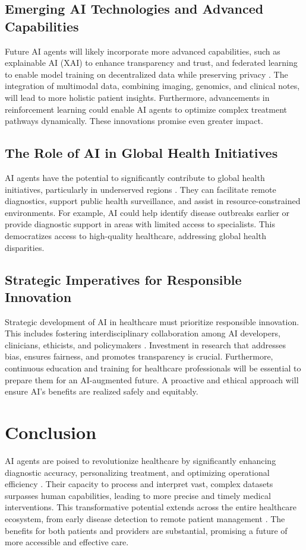 \documentclass[12pt,a4paper]{article}
\begin{document}
\subsection{Emerging AI Technologies and Advanced Capabilities}
Future AI agents will likely incorporate more advanced capabilities, such as explainable AI (XAI) to enhance transparency and trust, and federated learning to enable model training on decentralized data while preserving privacy \cite{google_health}. The integration of multimodal data, combining imaging, genomics, and clinical notes, will lead to more holistic patient insights. Furthermore, advancements in reinforcement learning could enable AI agents to optimize complex treatment pathways dynamically. These innovations promise even greater impact.

\subsection{The Role of AI in Global Health Initiatives}
AI agents have the potential to significantly contribute to global health initiatives, particularly in underserved regions \cite{who2021ai}. They can facilitate remote diagnostics, support public health surveillance, and assist in resource-constrained environments. For example, AI could help identify disease outbreaks earlier or provide diagnostic support in areas with limited access to specialists. This democratizes access to high-quality healthcare, addressing global health disparities.

\subsection{Strategic Imperatives for Responsible Innovation}
Strategic development of AI in healthcare must prioritize responsible innovation. This includes fostering interdisciplinary collaboration among AI developers, clinicians, ethicists, and policymakers \cite{duanemorris}. Investment in research that addresses bias, ensures fairness, and promotes transparency is crucial. Furthermore, continuous education and training for healthcare professionals will be essential to prepare them for an AI-augmented future. A proactive and ethical approach will ensure AI's benefits are realized safely and equitably.

\section{Conclusion}
AI agents are poised to revolutionize healthcare by significantly enhancing diagnostic accuracy, personalizing treatment, and optimizing operational efficiency \cite{topol2019highperformance}. Their capacity to process and interpret vast, complex datasets surpasses human capabilities, leading to more precise and timely medical interventions. This transformative potential extends across the entire healthcare ecosystem, from early disease detection to remote patient management \cite{nih_patient_outcomes}. The benefits for both patients and providers are substantial, promising a future of more accessible and effective care.
\end{document}
